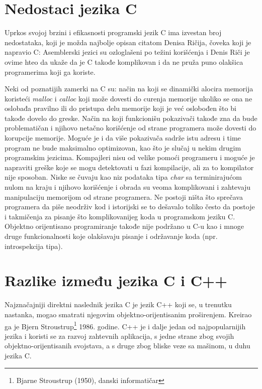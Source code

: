 \documentclass[a4paper]{article}
\begin{document}
\section{Nedostaci jezika C}
Uprkos svojoj brzini i efikasnosti programski jezik C ima izvestan broj nedostataka, koji je možda najbolje opisan citatom Denisa Ričija, čoveka koji je napravio C:  Asemblerski jezici su ozloglašeni po težini korišćenja i Denis Riči je ovime hteo da ukaže da je C takođe komplikovan i da ne pruža puno olakšica programerima koji ga koriste.

Neki od poznatijih zamerki na C su: način na koji se dinamički alocira memorija koristeći {\em malloc} i {\em calloc} koji može dovesti do curenja memorije ukoliko se ona ne oslobađa pravilno ili do pristupa delu memorije koji je već oslobođen što bi takođe dovelo do greske. Način na koji funkcionišu pokazivači takođe zna da bude problematičan i njihovo netačno korišćenje od strane programera može dovesti do korupcije memorije. Moguće je i da više pokazivača sadrže istu adresu i time program ne bude maksimalno optimizovan, kao što je slučaj u nekim drugim programskim jezicima. Kompajleri nisu od velike pomoći programeru i moguće je napraviti greške koje se mogu detektovati u fazi kompilacije, ali za to kompilator nije sposoban. Niske se čuvaju kao niz podataka tipa {\em char} sa terminirajućom nulom na kraju i njihovo korišćenje i obrada su veoma komplikovani i zahtevaju manipulaciju memorijom od strane programera. Ne postoji ništa što sprečava programera da piše neodrživ kod i istorijski se to dešavalo toliko često da postoje i takmičenja za pisanje što komplikovanijeg koda u programskom jeziku C. Objektno orijentisano programiranje takođe nije podržano u C-u kao i mnoge druge funkcionalnosti koje olakšavaju pisanje i održavanje koda (npr. introspekcija tipa).

\section{Razlike između jezika C i C++}
Najznačajniji direktni naslednik jezika C je jezik C++ koji se, u trenutku nastanka, mogao smatrati njegovim objektno-orijentisanim proširenjem. Kreirao ga je Bjern Stroustrup\footnote{Bjarne Stroustrup (1950), danski informatičar} 1986. godine. C++ je i dalje jedan od najpopularnijih jezika i koristi se za razvoj zahtevnih aplikacija, s jedne strane zbog svojih objektno-orijentisanih svojstava, a s druge zbog bliske veze sa mašinom, u duhu jezika C.
\end{document}
